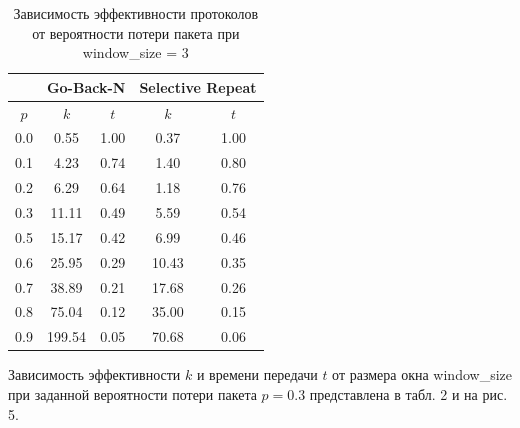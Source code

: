 \begin{table}[H]
	\begin{center}
		\begin{tabular}{|c|c|c|c|c|}
			\hline
			 & \multicolumn{2}{c|}{Go-Back-N} & \multicolumn{2}{c|}{Selective Repeat} \\
			\hline
			$p$ & $k$ & $t$ & $k$ & $t$ \\
			\hline
			0.0 & 0.55 & 1.00 & 0.37 & 1.00 \\
			\hline
			0.1 & 4.23 & 0.74 & 1.40 & 0.80\\
			\hline
			0.2 & 6.29 & 0.64 & 1.18 & 0.76\\
			\hline
			0.3 & 11.11 & 0.49 & 5.59 & 0.54\\
			\hline
			0.5 & 15.17 & 0.42 & 6.99 & 0.46\\
			\hline
			0.6 & 25.95 & 0.29 & 10.43 & 0.35\\
			\hline
			0.7 & 38.89 & 0.21 & 17.68 & 0.26\\
			\hline
			0.8 & 75.04 & 0.12 & 35.00 & 0.15\\
			\hline
			0.9 & 199.54 & 0.05 & 70.68 & 0.06\\
			\hline
		\end{tabular}
		\caption{ Зависимость эффективности протоколов от вероятности потери пакета при window\_size = 3}
	\end{center}
\end{table}


Зависимость
эффективности $k$ и времени передачи $t$ от размера окна window\_size при
заданной вероятности потери пакета $p = 0.3$ представлена в табл. 2 и на рис. 5.

